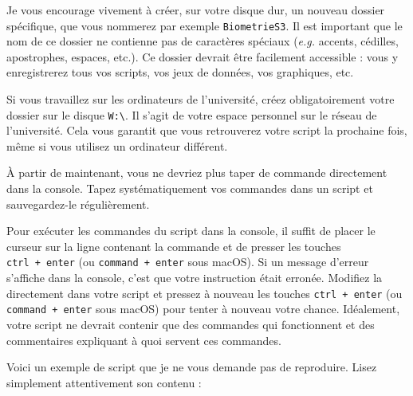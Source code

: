 \documentclass[
  a4paper,
  DIV=11,
  numbers=noendperiod,
  oneside]{scrreprt}
\begin{document}
\begin{tcolorbox}[enhanced jigsaw, colbacktitle=quarto-callout-important-color!10!white, left=2mm, leftrule=.75mm, titlerule=0mm, bottomtitle=1mm, colback=white, breakable, arc=.35mm, bottomrule=.15mm, toprule=.15mm, toptitle=1mm, opacitybacktitle=0.6, title=\textcolor{quarto-callout-important-color}{\faExclamation}\hspace{0.5em}{Où sauvegarder vos scripts ? {\faIcon{save}}}, coltitle=black, rightrule=.15mm, opacityback=0, colframe=quarto-callout-important-color-frame]

Je vous encourage vivement à créer, sur votre disque dur, un nouveau
dossier spécifique, que vous nommerez par exemple \texttt{BiometrieS3}.
Il est important que le nom de ce dossier ne contienne pas de caractères
spéciaux (\emph{e.g.} accents, cédilles, apostrophes, espaces, etc.). Ce
dossier devrait être facilement accessible : vous y enregistrerez tous
vos scripts, vos jeux de données, vos graphiques, etc.

Si vous travaillez sur les ordinateurs de l'université, créez
{obligatoirement} votre dossier sur le disque
\texttt{W:\textbackslash{}}. Il s'agit de votre espace personnel sur le
réseau de l'université. Cela vous garantit que vous retrouverez votre
script la prochaine fois, même si vous utilisez un ordinateur différent.

\end{tcolorbox}

À partir de maintenant, vous ne devriez plus taper de commande
directement dans la console. Tapez systématiquement vos commandes dans
un script et sauvegardez-le régulièrement.

Pour exécuter les commandes du script dans la console, il suffit de
placer le curseur sur la ligne contenant la commande et de presser les
touches \texttt{ctrl\ +\ enter} (ou \texttt{command\ +\ enter} sous
macOS). Si un message d'erreur s'affiche dans la console, c'est que
votre instruction était erronée. Modifiez la directement dans votre
script et pressez à nouveau les touches \texttt{ctrl\ +\ enter} (ou
\texttt{command\ +\ enter} sous macOS) pour tenter à nouveau votre
chance. Idéalement, votre script ne devrait contenir que des commandes
qui fonctionnent et des commentaires expliquant à quoi servent ces
commandes.

Voici un exemple de script que je ne vous demande pas de reproduire.
Lisez simplement attentivement son contenu :
\end{document}
